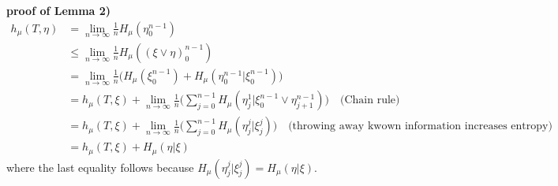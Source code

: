 \documentclass[12pt,a4paper]{report}
\newenvironment{proof}
{\begin{changemargin}{1cm}{0.5cm} 
	}%
	{\end{changemargin}
}
\begin{document}
\begin{proof}
\textbf{proof of Lemma 2)} \begin{align*}
h_{\mu}(T,\eta) &= \lim_{n\rightarrow \infty} \frac{1}{n} H_{\mu}(\eta^{n-1}_0) \\
& \leq \lim_{n\rightarrow \infty} \frac{1}{n} H_{\mu}((\xi \vee \eta)_0^{n-1}) \\
&= \lim_{n\rightarrow \infty} \frac{1}{n}\Big( H_{\mu}(\xi_0^{n-1}) + H_{\mu}(\eta_0^{n-1} | \xi_0^{n-1}) \Big) \\
&= h_{\mu}(T,\xi) + \lim_{n\rightarrow \infty} \frac{1}{n} \Big( \sum_{j=0}^{n-1} H_{\mu}(\eta_j^1 | \xi_0^{n-1} \vee \eta_{j+1}^{n-1})  \Big) \quad \text{(Chain rule)} \\ 
&= h_{\mu}(T,\xi) + \lim_{n\rightarrow \infty} \frac{1}{n} \Big( \sum_{j=0}^{n-1} H_{\mu} (\eta_j^j | \xi_j^j) \Big) \quad \text{(throwing away kwown information increases entropy)}\\
&= h_{\mu}(T, \xi) + H_{\mu}(\eta |\xi)
\end{align*}
where the last equality follows because $H_{\mu} (\eta_j^j | \xi_j^j) = H_{\mu}(\eta |\xi)$.

\eop
\end{proof}
\s
\end{document}
